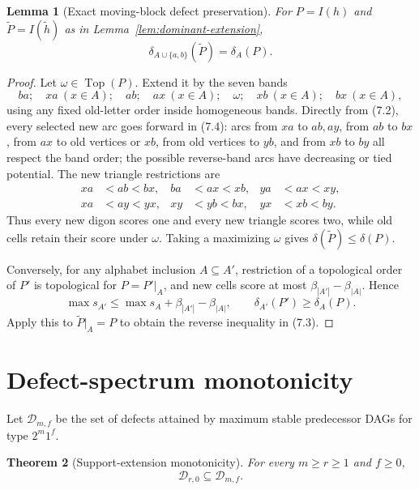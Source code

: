 \documentclass[11pt,a4paper]{article}
\newtheorem{theorem}{Theorem}[section]
\newtheorem{lemma}[theorem]{Lemma}
\theoremstyle{remark}
\newcommand{\Top}{\operatorname{Top}}
\newcommand{\Dspec}{\mathcal D}
\begin{document}
\begin{lemma}[Exact moving-block defect preservation]
\label{lem:defect-extension}
For \(P=I(h)\) and \(\widetilde P=I(\widetilde h)\) as in
Lemma~\ref{lem:dominant-extension},
\[
 \delta_{A\cup\{a,b\}}(\widetilde P)=\delta_A(P).       \tag{7.3}
\]
\end{lemma}

\begin{proof}
Let \(\omega\in\Top(P)\).  Extend it by the seven bands
\[
 ba;\quad xa\ (x\in A);\quad ab;\quad ax\ (x\in A);\quad
 \omega;\quad xb\ (x\in A);\quad bx\ (x\in A),         \tag{7.4}
\]
using any fixed old-letter order inside homogeneous bands.  Directly from
(7.2), every selected new arc goes forward in (7.4): arcs from \(xa\) to
\(ab,ay\), from \(ab\) to \(bx\), from \(ax\) to old vertices or \(xb\),
from old vertices to \(yb\), and from \(xb\) to \(by\) all respect the band
order; the possible reverse-band arcs have decreasing or tied potential.
The new triangle restrictions are
\[
 \begin{aligned}
 xa&<ab<bx, & ba&<ax<xb, & ya&<ax<xy,\\
 xa&<ay<yx, & xy&<yb<bx, & yx&<xb<by.
 \end{aligned}
\]
Thus every new digon scores one and every new triangle scores two, while old
cells retain their score under \(\omega\).  Taking a maximizing \(\omega\)
gives \(\delta(\widetilde P)\leq\delta(P)\).

Conversely, for any alphabet inclusion \(A\subseteq A'\), restriction of a
topological order of \(P'\) is topological for \(P=P'|_A\), and new cells
score at most \(\beta_{|A'|}-\beta_{|A|}\).  Hence
\[
 \max s_{A'}\leq\max s_A+\beta_{|A'|}-\beta_{|A|},
 \qquad \delta_{A'}(P')\geq\delta_A(P).
\]
Apply this to \(\widetilde P|_A=P\) to obtain the reverse inequality in
(7.3).
\end{proof}

\section{Defect-spectrum monotonicity}
\label{sec:monotonicity}

Let \(\Dspec_{m,f}\) be the set of defects attained by maximum stable
predecessor DAGs for type \(2^m1^f\).

\begin{theorem}[Support-extension monotonicity]
\label{thm:monotonicity}
For every \(m\geq r\geq1\) and \(f\geq0\),
\[
 \Dspec_{r,0}\subseteq\Dspec_{m,f}.
\]
\end{theorem}
\end{document}
